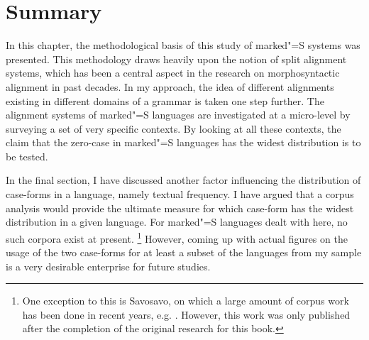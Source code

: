 \section{Summary}

In this chapter, the methodological basis of this study of marked"=S systems was presented.
This methodology draws heavily upon the notion of split alignment systems, which has been a central aspect in the research on morphosyntactic alignment in past decades.
In my approach, the idea of different alignments existing in different domains of a grammar is taken one step further.
The alignment systems of marked"=S languages are investigated at a micro-level by surveying a set of very specific contexts. 
By looking at all these contexts, the claim that the zero-case in marked"=S languages has the widest distribution is to be tested.

In the final section, I have discussed another factor influencing the distribution of case-forms in a language, namely textual frequency.
I have argued that a corpus analysis would provide the ultimate measure for which case-form has the widest distribution in a given language.
For marked"=S languages dealt with here, no such corpora exist at present.
\footnote{One exception to this is Savosavo, on which a large amount of corpus work has been done in recent years, e.g. \citet{Haig:2011}. 
However, this work was only published after the completion of the original research for this book.}  
However, coming up with actual figures on the usage of the two case-forms for at least a subset of the languages from my sample is a very desirable enterprise for future studies.





